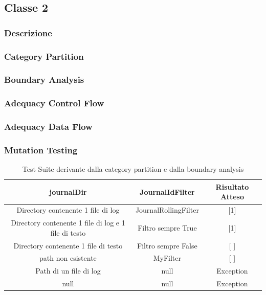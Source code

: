 \documentclass[12pt, a4paper]{article}
\begin{document}
\subsection{Classe 2}
\subsubsection{Descrizione}
\subsubsection{Category Partition}
\subsubsection{Boundary Analysis}
\subsubsection{Adequacy Control Flow}
\subsubsection{Adequacy Data Flow}
\subsubsection{Mutation Testing}













\begin{table}[ht]
  \centering
  \caption[Journal: Test Suite - Category Partition]{Test Suite derivante dalla category partition e dalla boundary analysis}
  \begin{tabular}{|c|c|c|}
  \hline
  journalDir & JournalIdFilter & Risultato Atteso \\
  \hline
  {Directory contenente 1 file di log} & JournalRollingFilter & [1] \\
  {Directory contenente 1 file di log e 1 file di testo} & Filtro sempre True & [1] \\
  {Directory contenente 1 file di testo} & Filtro sempre False & [ ] \\
  {path non esistente} & MyFilter & [ ] \\
  {Path di un file di log} & null & Exception \\
  null & null & Exception \\
  \hline
  \end{tabular}
  \label{tab:categoryPartition1ListJournalIds}
\end{table}
\end{document}
